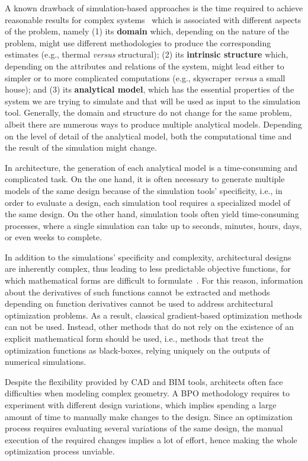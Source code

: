 	A known drawback of simulation-based approaches is the time required to achieve reasonable results for complex systems~\cite{Law1991} which is associated with different aspects of the problem, namely (1) its \textbf{domain} which, depending on the nature of the problem, might use different methodologies to produce the corresponding estimates (e.g., thermal \textit{versus} structural); (2) its \textbf{intrinsic structure} which, depending on the attributes and relations of the system, might lead either to simpler or to more complicated computations (e.g., skyscraper \textit{versus} a small house); and (3) its \textbf{analytical model}, which has the essential properties of the system we are trying to simulate and that will be used as input to the simulation tool. Generally, the domain and structure do not change for the same problem, albeit there are numerous ways to produce multiple analytical models. Depending on the level of detail of the analytical model, both the computational time and the result of the simulation might change. 

	In architecture, the generation of each analytical model is a time-consuming and complicated task. On the one hand, it is often necessary to generate multiple models of the same design because of the simulation tools' specificity, i.e., in order to evaluate a design, each simulation tool requires a specialized model of the same design. On the other hand, simulation tools often yield time-consuming processes, where a single simulation can take up to seconds, minutes, hours, days, or even weeks to complete. 
	
	In addition to the simulations' specificity and complexity, architectural designs are inherently complex, thus leading to less predictable objective functions, for which mathematical forms are difficult to formulate~\cite{Machairas2014}. For this reason, information about the derivatives of such functions cannot be extracted and methods depending on function derivatives cannot be used to address architectural optimization problems. As a result, classical gradient-based optimization methods can not be used. Instead, other methods that do not rely on the existence of an explicit mathematical form should be used, i.e., methods that treat the optimization functions as black-boxes, relying uniquely on the outputs of numerical simulations.
	
	Despite the flexibility provided by \ac{CAD} and \ac{BIM} tools, architects often face difficulties when modeling complex geometry. A \ac{BPO} methodology requires to experiment with different design variations, which implies spending a large amount of time to manually make changes to the design. Since an optimization process requires evaluating several variations of the same design, the manual execution of the required changes implies a lot of effort, hence making the whole optimization process unviable.
	
